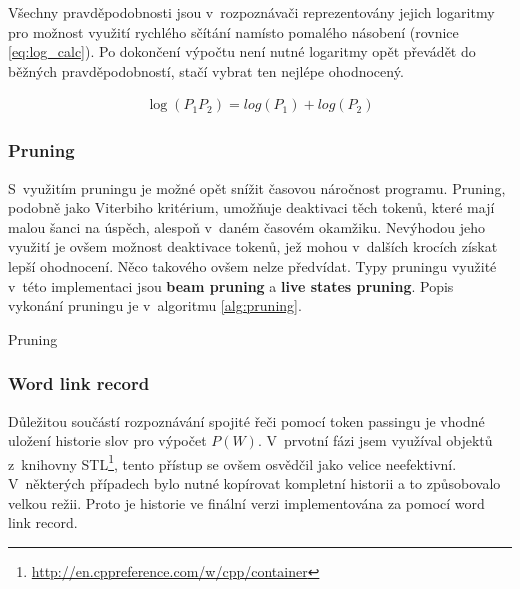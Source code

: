 Všechny pravděpodobnosti jsou v~rozpoznávači reprezentovány jejich logaritmy pro možnost využití rychlého sčítání namísto pomalého násobení (rovnice \ref{eq:log_calc}). Po dokončení výpočtu není nutné logaritmy opět převádět do běžných pravděpodobností, stačí vybrat ten nejlépe ohodnocený.

\begin{equation} \label{eq:log_calc}
\begin{gathered}
\log(P_1 P_2) = log(P_1) + log(P_2)
\end{gathered}
\end{equation}

\subsubsection{Pruning}
S~využitím pruningu je možné opět snížit časovou náročnost programu. Pruning, podobně jako Viterbiho kritérium, umožňuje deaktivaci těch tokenů, které mají malou šanci na úspěch, alespoň v~daném časovém okamžiku. Nevýhodou jeho využití je ovšem možnost deaktivace tokenů, jež mohou v~dalších krocích získat lepší ohodnocení. Něco takového ovšem nelze předvídat. Typy pruningu využité v~této implementaci jsou \textbf{beam pruning} a \textbf{live states pruning}. Popis vykonání pruningu je v~algoritmu \ref{alg:pruning}.

\begin{center}
\begin{czechalgorithm}[H] \label{alg:pruning}
 \caption{Pruning}
\end{czechalgorithm}
\end{center}

\subsubsection{Word link record} \label{sec:word_link_record}
Důležitou součástí rozpoznávání spojité řeči pomocí token passingu je vhodné uložení historie slov pro výpočet $P(W)$. V~prvotní fázi jsem využíval objektů z~knihovny STL\footnote{\url{http://en.cppreference.com/w/cpp/container}}, tento přístup se ovšem osvědčil jako velice neefektivní. V~některých případech bylo nutné kopírovat kompletní historii a to způsobovalo velkou režii. Proto je historie ve finální verzi implementována za pomocí word link record.

